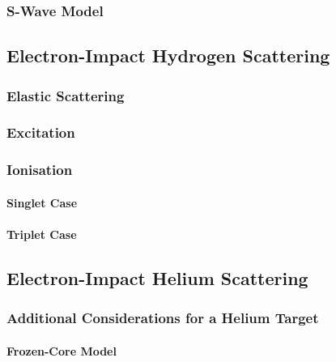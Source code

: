 \documentclass[draft]{article}
\begin{document}
\subsubsection{S-Wave Model}
\label{sec:s-wave-model}

\subsection{Electron-Impact Hydrogen Scattering}
\label{sec:e-h}

\subsubsection{Elastic Scattering}
\label{sec:e-h-elastic-scattering}

\subsubsection{Excitation}
\label{sec:e-h-excitation}

\subsubsection{Ionisation}
\label{sec:e-h-ionisation}

\paragraph{Singlet Case}
\label{sec:e-h-singlet}

\paragraph{Triplet Case}
\label{sec:e-h-triplet}

\subsection{Electron-Impact Helium Scattering}
\label{sec:e-he}

\subsubsection{Additional Considerations for a Helium Target}
\label{sec:he-target}

\paragraph{Frozen-Core Model}
\label{sec:he-frozen-core}
\end{document}
